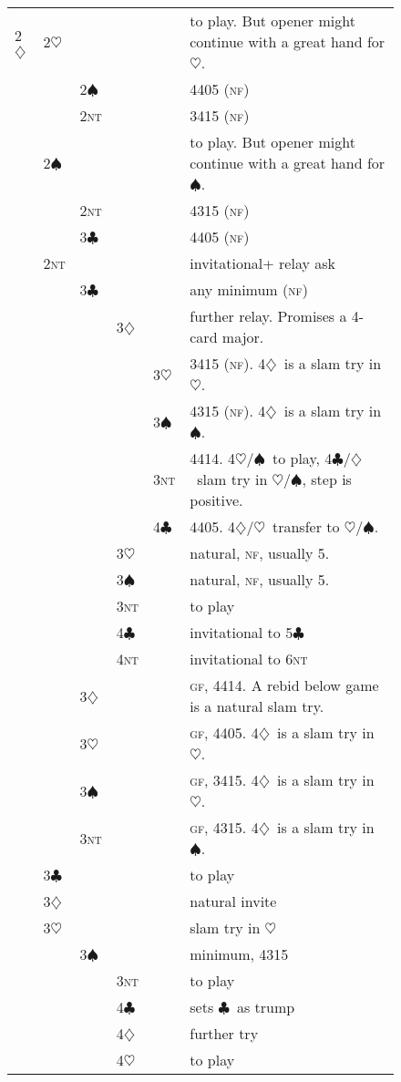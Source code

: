 \documentclass{report}
\newcommand{\gf}{\textsc{gf}}
\newcommand{\nf}{\textsc{nf}}
\renewcommand{\c}{\ensuremath{\clubsuit}}
\renewcommand{\d}{\ensuremath{\diamondsuit}}
\newcommand{\h}{\ensuremath{\heartsuit}}
\newcommand{\s}{\ensuremath{\spadesuit}}
\newcommand{\nt}{\textsc{nt}}
\newcommand{\+}{\ensuremath{^+}}
\begin{document}
\begin{figure}[ht]
\begin{tabular}{llllll}
2\d
&2\h &&&&to play.  But opener might continue with a great hand for \h.\\
&    &2\s &&&4405 (\nf)\\
&    &2\nt&&&3415 (\nf)\\
&2\s &&&&to play.  But opener might continue with a great hand for \s.\\
&    &2\nt&&&4315 (\nf)\\
&    &3\c &&&4405 (\nf)\\
&2\nt&&&&invitational+ relay ask\\
&    &3\c &&&any minimum (\nf)\\
&    &    &3\d &&further relay.  Promises a 4-card major.\\
&    &    &    &3\h &3415 (\nf). 4\d\ is a slam try in \h.\\
&    &    &    &3\s &4315 (\nf). 4\d\ is a slam try in \s.\\
&    &    &    &3\nt&4414. 4\h/\s\ to play, 4\c/\d\ slam try in \h/\s, step is positive.\\
&    &    &    &4\c &4405. 4\d/\h\ transfer to \h/\s.\\
&    &    &3\h &&natural, \nf, usually 5.\\
&    &    &3\s &&natural, \nf, usually 5.\\
&    &    &3\nt&&to play\\
&    &    &4\c &&invitational to 5\c\\
&    &    &4\nt&&invitational to 6\nt\\
&    &3\d &&&\gf, 4414.  A rebid below game is a natural slam try.\\
&    &3\h &&&\gf, 4405.  4\d\ is a slam try in \h.\\
&    &3\s &&&\gf, 3415.  4\d\ is a slam try in \h.\\
&    &3\nt&&&\gf, 4315.  4\d\ is a slam try in \s.\\
&3\c &&&&to play\\
&3\d &&&&natural invite\\
&3\h &&&&slam try in \h\\
&    &3\s &&&minimum, 4315\\
&    &    &3\nt&&to play\\
&    &    &4\c &&sets \c\ as trump\\
&    &    &4\d &&further try\\
&    &    &4\h &&to play\\

\end{tabular}
\end{figure}
\end{document}
